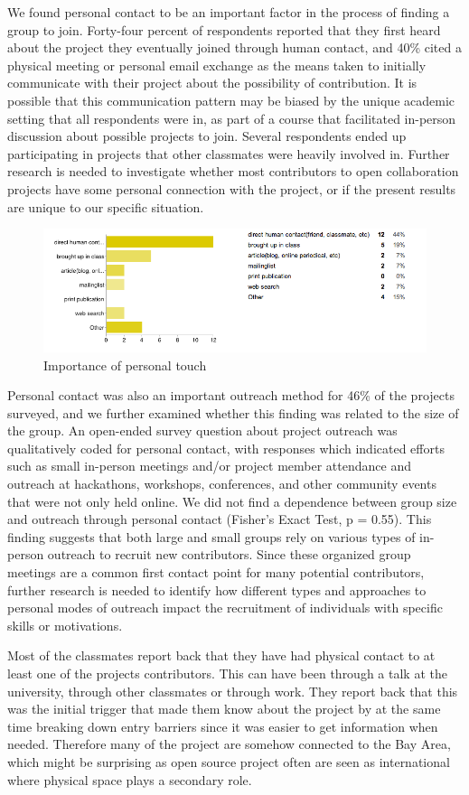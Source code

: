 We found personal contact to be an important factor in the process of finding a group to join. Forty-four percent of respondents reported that they first heard about the project they eventually joined through human contact, and 40\% cited a physical meeting or personal email exchange as the means taken to initially communicate with their project about the possibility of contribution. It is possible that this communication pattern may be biased by the unique academic setting that all respondents were in, as part of a course that facilitated in-person discussion about possible projects to join. Several respondents ended up participating in projects that other classmates were heavily involved in. Further research is needed to investigate whether most contributors to open collaboration projects have some personal connection with the project, or if the present results are unique to our specific situation.


\begin{figure}[ht!]
\centering
\includegraphics[width=120mm]{chapters/img/importance_of_personal_touch.png}
\caption{Importance of personal touch}
\label{overflow}
\end{figure}


Personal contact was also an important outreach method for 46\% of the projects surveyed, and we further examined whether this finding was related to the size of the group. An open-ended survey question about project outreach was qualitatively coded for personal contact, with responses which indicated efforts such as small in-person meetings and/or project member attendance and outreach at hackathons, workshops, conferences, and other community events that were not only held online. We did not find a dependence between group size and outreach through personal contact (Fisher’s Exact Test, p = 0.55). This finding suggests that both large and small groups rely on various types of in-person outreach to recruit new contributors. Since these organized group meetings are a common first contact point for many potential contributors, further research is needed to identify how different types and approaches to personal modes of outreach impact the recruitment of individuals with specific skills or motivations.


Most of the classmates report back that they have had physical contact to at least one of the projects contributors. This can have been through a talk at the university, through other classmates or through work. They report back that this was the initial trigger that made them know about the project by at the same time breaking down entry barriers since it was easier to get information when needed. Therefore many of the project are somehow connected to the Bay Area, which might be surprising as open source project often are seen as international where physical space plays a secondary role.